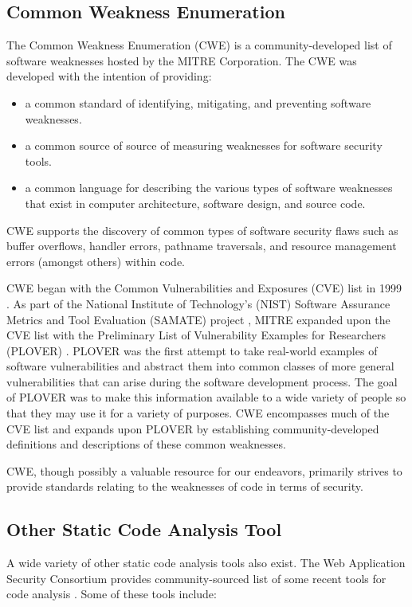 \documentclass{sig-alternate}
\begin{document}
\subsection{Common Weakness Enumeration}
The Common Weakness Enumeration (CWE) \cite{mitre2006cwe} is a community-developed list of software weaknesses hosted by the MITRE Corporation. The CWE was developed with the intention of providing:

\begin{itemize}
\item a common standard of identifying, mitigating, and preventing software weaknesses.
\item a common source of source of measuring weaknesses for software security tools.
\item a common language for describing the various types of software weaknesses that exist in computer architecture, software design, and source code.
\end{itemize}

CWE supports the discovery of common types of software security flaws such as buffer overflows, handler errors, pathname traversals, and resource management errors (amongst others) within code.

CWE began with the Common Vulnerabilities and Exposures (CVE) list in 1999 \cite{mitre2005cve}. As part of the National Institute of Technology's (NIST) Software Assurance Metrics and Tool Evaluation (SAMATE) project \cite{nist2005samate}, MITRE expanded upon the CVE list with the Preliminary List of Vulnerability Examples for Researchers (PLOVER) \cite{christey2005plover}. PLOVER was the first attempt to take real-world examples of software vulnerabilities and abstract them into common classes of more general vulnerabilities that can arise during the software development process. The goal of PLOVER was to make this information available to a wide variety of people so that they may use it for a variety of purposes. CWE encompasses much of the CVE list and expands upon PLOVER by establishing community-developed definitions and descriptions of these common weaknesses.

CWE, though possibly a valuable resource for our endeavors, primarily strives to provide standards relating to the weaknesses of code in terms of security.

\subsection{Other Static Code Analysis Tool}
A wide variety of other static code analysis tools also exist. The Web Application Security Consortium provides community-sourced list of some recent tools for code analysis \cite{webappsec2012}. Some of these tools include:
\end{document}
